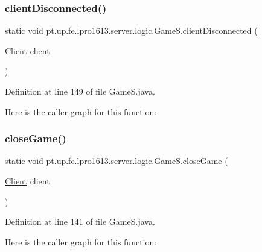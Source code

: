 \subsubsection{\texorpdfstring{client\+Disconnected()}{clientDisconnected()}}
{\footnotesize\ttfamily static void pt.\+up.\+fe.\+lpro1613.\+server.\+logic.\+Game\+S.\+client\+Disconnected (\begin{DoxyParamCaption}\item[{\hyperlink{classpt_1_1up_1_1fe_1_1lpro1613_1_1server_1_1conn_1_1_client}{Client}}]{client }\end{DoxyParamCaption})\hspace{0.3cm}{\ttfamily [static]}}



Definition at line 149 of file Game\+S.\+java.

Here is the caller graph for this function\+:
\hypertarget{classpt_1_1up_1_1fe_1_1lpro1613_1_1server_1_1logic_1_1_game_s_a6d26b0fcc16136e701003a0c6b8f2960}{}\label{classpt_1_1up_1_1fe_1_1lpro1613_1_1server_1_1logic_1_1_game_s_a6d26b0fcc16136e701003a0c6b8f2960} 
\subsubsection{\texorpdfstring{close\+Game()}{closeGame()}}
{\footnotesize\ttfamily static void pt.\+up.\+fe.\+lpro1613.\+server.\+logic.\+Game\+S.\+close\+Game (\begin{DoxyParamCaption}\item[{\hyperlink{classpt_1_1up_1_1fe_1_1lpro1613_1_1server_1_1conn_1_1_client}{Client}}]{client }\end{DoxyParamCaption})\hspace{0.3cm}{\ttfamily [static]}}



Definition at line 141 of file Game\+S.\+java.

Here is the caller graph for this function\+:
\hypertarget{classpt_1_1up_1_1fe_1_1lpro1613_1_1server_1_1logic_1_1_game_s_aacc27bbcb911c57f6a22d8995dbb2b71}{}\label{classpt_1_1up_1_1fe_1_1lpro1613_1_1server_1_1logic_1_1_game_s_aacc27bbcb911c57f6a22d8995dbb2b71} 
